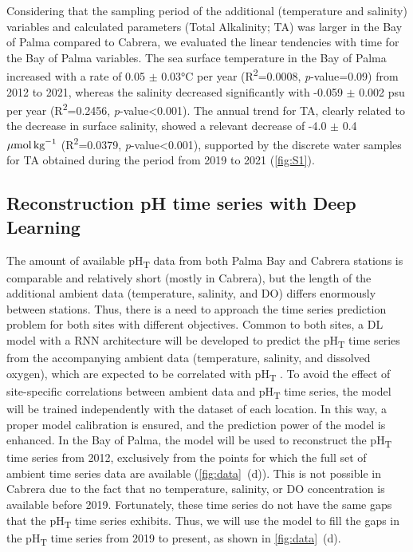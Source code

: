 Considering that the sampling period of the additional (temperature and
salinity) variables and calculated parameters (Total Alkalinity; TA) was larger
in the Bay of Palma compared to Cabrera, we evaluated the linear tendencies
with time for the Bay of Palma variables. The sea surface temperature in the
Bay of Palma increased with a rate of 0.05 $\pm$ 0.03°C per year
(R\textsuperscript{2}=0.0008, \emph{p}-value=0.09) from 2012 to 2021, whereas
the salinity decreased significantly with -0.059 $\pm$ 0.002 psu per year
(R\textsuperscript{2}=0.2456, \emph{p}-value<0.001). The annual trend for TA,
clearly related to the decrease in surface salinity, showed a relevant decrease
of -4.0 $\pm$ 0.4 ${\mu\textrm{mol\,kg}^{-1}}$ (R\textsuperscript{2}=0.0379,
\emph{p}-value<0.001), supported by the discrete water samples for TA obtained
during the period from 2019 to 2021  (\cref{fig:S1}).

\subsection{Reconstruction pH time series with Deep Learning}

The amount of available pH\textsubscript{T} data from both Palma Bay and
Cabrera stations is comparable and relatively short (mostly in Cabrera), but
the length of the additional ambient data (temperature, salinity, and DO)
differs enormously between stations. Thus, there is a need to approach the time
series prediction problem for both sites with different objectives. Common to
both sites, a DL model with a RNN architecture will be developed to predict the
pH\textsubscript{T} time series from the accompanying ambient data
(temperature, salinity, and dissolved oxygen), which are expected to be
correlated with pH\textsubscript{T} \cite{Fourrier2020,Broullon2021}. To avoid
the effect of site-specific correlations between ambient data and
pH\textsubscript{T} time series, the model will be trained independently with
the dataset of each location. In this way, a proper model calibration is
ensured, and the prediction power of the model is enhanced. In the Bay of
Palma, the model will be used to reconstruct the pH\textsubscript{T} time
series from 2012, exclusively from the points for which the full set of ambient
time series data are available (\cref{fig:data}~\textcolor{ref_color}{(d)}).
This is not possible in
Cabrera due to the fact that no temperature, salinity, or DO concentration is
available before 2019. Fortunately, these time series do not have the same gaps
that the pH\textsubscript{T} time series exhibits. Thus, we will use the model
to fill the gaps in the pH\textsubscript{T} time series from 2019 to present,
as shown in \cref{fig:data}~\textcolor{ref_color}{(d)}.

